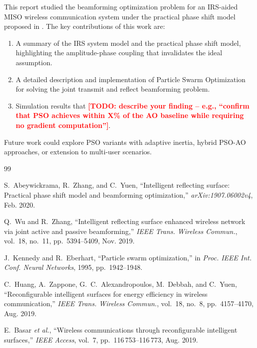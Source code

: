 \documentclass[12pt, a4paper]{article}
\newcommand{\TODO}[1]{\textcolor{red}{\textbf{[TODO: #1]}}}  %
\begin{document}
This report studied the beamforming optimization problem for an IRS-aided MISO
wireless communication system under the practical phase shift model proposed
in \cite{abeywickrama2020}. The key contributions of this work are:
\begin{enumerate}
    \item A summary of the IRS system model and the practical phase shift model,
          highlighting the amplitude-phase coupling that invalidates the ideal assumption.
    \item A detailed description and implementation of Particle Swarm Optimization
          for solving the joint transmit and reflect beamforming problem.
    \item Simulation results that \TODO{describe your finding -- e.g., ``confirm
          that PSO achieves within X\% of the AO baseline while requiring no
          gradient computation''}.
\end{enumerate}

Future work could explore PSO variants with adaptive inertia, hybrid
PSO-AO approaches, or extension to multi-user scenarios.


\begin{thebibliography}{99}

S.~Abeywickrama, R.~Zhang, and C.~Yuen,
``Intelligent reflecting surface: Practical phase shift model and beamforming optimization,''
\textit{arXiv:1907.06002v4}, Feb. 2020.

Q.~Wu and R.~Zhang,
``Intelligent reflecting surface enhanced wireless network via joint active and passive beamforming,''
\textit{IEEE Trans. Wireless Commun.}, vol.~18, no.~11, pp.~5394--5409, Nov. 2019.

J.~Kennedy and R.~Eberhart,
``Particle swarm optimization,''
in \textit{Proc. IEEE Int. Conf. Neural Networks}, 1995, pp.~1942--1948.

C.~Huang, A.~Zappone, G.~C.~Alexandropoulos, M.~Debbah, and C.~Yuen,
``Reconfigurable intelligent surfaces for energy efficiency in wireless communication,''
\textit{IEEE Trans. Wireless Commun.}, vol.~18, no.~8, pp.~4157--4170, Aug. 2019.

E.~Basar \textit{et al.},
``Wireless communications through reconfigurable intelligent surfaces,''
\textit{IEEE Access}, vol.~7, pp.~116\,753--116\,773, Aug. 2019.

\end{thebibliography}
\end{document}
